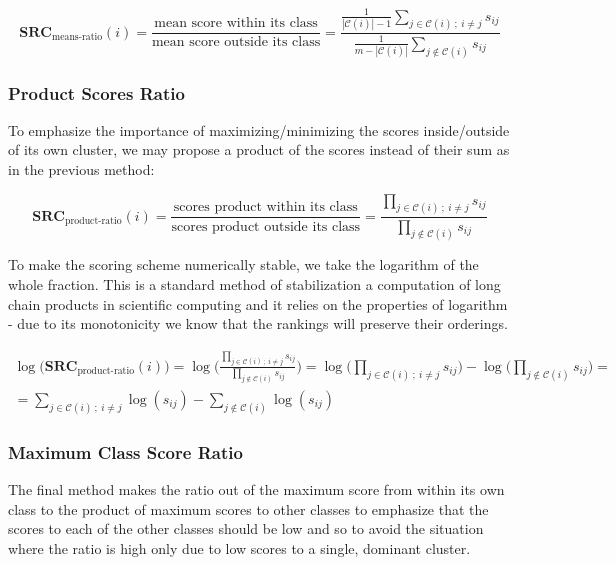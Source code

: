 \begin{equation}
    \textbf{SRC}_{\text{means-ratio}}(i) =
        \frac{\text{mean score within its class} }{\text{mean score outside its class} } =
    \frac{
        \frac{1}{|\mathcal{C}(i)| - 1} \sum_{j \in \mathcal{C}(i) ~;~ i \neq j} s_{ij}
    }{
        \frac{1}{m - |\mathcal{C}(i)|} \sum_{j \notin \mathcal{C}(i)} s_{ij}
    }
\end{equation}


\subsubsection{Product Scores Ratio}
To emphasize the importance of maximizing/minimizing the scores inside/outside of its own cluster, we may propose a product of the scores instead of their sum as in the previous method:

\begin{equation}
    \textbf{SRC}_{\text{product-ratio}}(i) =
        \frac{\text{scores product within its class} }{\text{scores product outside its class} } =
    \frac{
        \prod_{j \in \mathcal{C}(i) ~;~ i \neq j} s_{ij}
    }{
        \prod_{j \notin \mathcal{C}(i)} s_{ij}
    }
\end{equation}

To make the scoring scheme numerically stable, we take the logarithm of the whole fraction. This is a standard method of stabilization a computation of long chain products in scientific computing and it relies on the properties of logarithm - due to its monotonicity we know that the rankings will preserve their orderings.

\begin{multline}
    \log \Big( \textbf{SRC}_{\text{product-ratio}}(i) \Big) =
    \log \Bigg(
    \frac{
        \prod_{j \in \mathcal{C}(i) ~;~ i \neq j} s_{ij}
    }{
        \prod_{j \notin \mathcal{C}(i)} s_{ij}
    } \Bigg) =
    \log \Bigg( \prod_{j \in \mathcal{C}(i) ~;~ i \neq j} s_{ij} \Bigg) -
    \log \Bigg( \prod_{j \notin \mathcal{C}(i)} s_{ij} \Bigg) =\\=
    \sum_{j \in \mathcal{C}(i) ~;~ i \neq j} \log(s_{ij}) - 
    \sum_{j \notin \mathcal{C}(i)} \log(s_{ij})
\end{multline}

\subsubsection{Maximum Class Score Ratio}
The final method makes the ratio out of the maximum score from within its own class to the product of maximum scores to other classes to emphasize that the scores to each of the other classes should be low and so to avoid the situation where the ratio is high only due to low scores to a single, dominant cluster.

